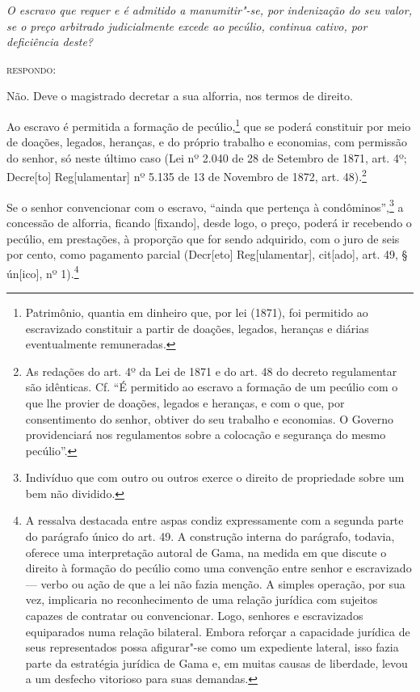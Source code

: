 \emph{O escravo que requer e é admitido a
manumitir"-se, por indenização do seu valor, se o preço arbitrado
judicialmente excede ao pecúlio, continua cativo, por deficiência
deste?}

\textsc{respondo:}

Não. Deve o magistrado decretar a sua alforria, nos termos de direito.

\asterisc

Ao escravo é permitida a formação de pecúlio,\footnote{Patrimônio,
  quantia em dinheiro que, por lei (1871), foi permitido ao escravizado
  constituir a partir de doações, legados, heranças e diárias
  eventualmente remuneradas.} que se poderá constituir por meio de
doações, legados, heranças, e do próprio trabalho e economias, com
permissão do senhor, só neste último caso (Lei nº 2.040 de 28 de
Setembro de 1871, art. 4º; Decre{[}to{]} Reg{[}ulamentar{]} nº 5.135 de
13 de Novembro de 1872, art. 48).\footnote{As redações do art. 4º da
  Lei de 1871 e do art. 48 do decreto regulamentar são idênticas. Cf. ``É
  permitido ao escravo a formação de um pecúlio com o que lhe provier de
  doações, legados e heranças, e com o que, por consentimento do senhor,
  obtiver do seu trabalho e economias. O Governo providenciará nos
  regulamentos sobre a colocação e segurança do mesmo pecúlio''.}

Se o senhor convencionar com o escravo, ``ainda que pertença à
condôminos'',\footnote{Indivíduo que com outro ou outros exerce o
  direito de propriedade sobre um bem não dividido.} a concessão de
alforria, ficando {[}fixando{]}, desde logo, o preço, poderá ir
recebendo o pecúlio, em prestações, à proporção que for sendo adquirido,
com o juro de seis por cento, como pagamento parcial (Decr{[}eto{]}
Reg{[}ulamentar{]}, cit{[}ado{]}, art. 49, § ún{[}ico{]}, nº
1).\footnote{A ressalva destacada entre aspas condiz expressamente com
  a segunda parte do parágrafo único do art. 49. A construção interna do
  parágrafo, todavia, oferece uma interpretação autoral de Gama,
  na medida em que discute o direito à formação do pecúlio como uma
  convenção entre senhor e escravizado --- verbo ou ação de que a lei não
  fazia menção. A simples operação, por sua vez, implicaria no
  reconhecimento de uma relação jurídica com sujeitos capazes de
  contratar ou convencionar. Logo, senhores e escravizados equiparados
  numa relação bilateral. Embora reforçar a capacidade jurídica de seus
  representados possa afigurar"-se como um expediente lateral, isso fazia
  parte da estratégia jurídica de Gama e, em muitas causas de liberdade,
  levou a um desfecho vitorioso para suas demandas.}


